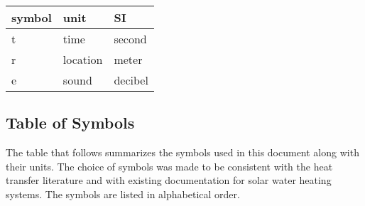 \documentclass[12pt]{article}
\begin{document}
\renewcommand{\arraystretch}{1.2}
  \noindent \begin{tabular}{l l l} 
    \toprule		
    \textbf{symbol} & \textbf{unit} & \textbf{SI}\\
    \midrule 
    \si t & time & second\\
    \si r & location & meter\\
    \si e & sound & decibel\\
    \bottomrule
  \end{tabular}

%


\subsection{Table of Symbols}

The table that follows summarizes the symbols used in this document along with
their units.  The choice of symbols was made to be consistent with the heat
transfer literature and with existing documentation for solar water heating
systems.  The symbols are listed in alphabetical order.
\end{document}
